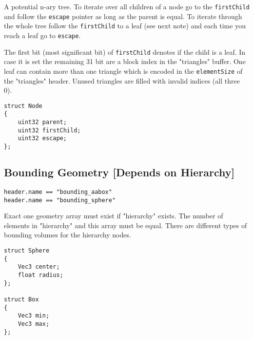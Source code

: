 \documentclass[english,10pt,a4paper,twocolumn,colorscheme=green]{orarticle}
\begin{document}
	A potential n-ary tree. To iterate over all children of a node go to the \lstinline|firstChild| and follow the \lstinline|escape| pointer as long as the parent is equal. To iterate through the whole tree follow the \lstinline|firstChild| to a leaf (see next note) and each time you reach a leaf go to \lstinline|escape|.
	
	The first bit (most significant bit) of \lstinline|firstChild| denotes if the child is a leaf. In case it is set the remaining 31 bit are a block index in the "triangles" buffer. One leaf can contain more than one triangle which is encoded in the \lstinline|elementSize| of the "triangles" header. Unused triangles are filled with invalid indices (all three 0).
	\begin{lstlisting}
struct Node
{
	uint32 parent;
	uint32 firstChild;
	uint32 escape;
};
	\end{lstlisting}
	
	\subsection{Bounding Geometry [Depends on Hierarchy]}
	\lstinline|header.name == "bounding_aabox"|\\
	\lstinline|header.name == "bounding_sphere"|
	
	Exact one geometry array must exist if "hierarchy" exists. The number of elements in "hierarchy" and this array must be equal. There are different types of bounding volumes for the hierarchy nodes.
	\begin{lstlisting}
struct Sphere
{
	Vec3 center;
	float radius;
};

struct Box
{
	Vec3 min;
	Vec3 max;
};
	\end{lstlisting}		
		
\end{document}
